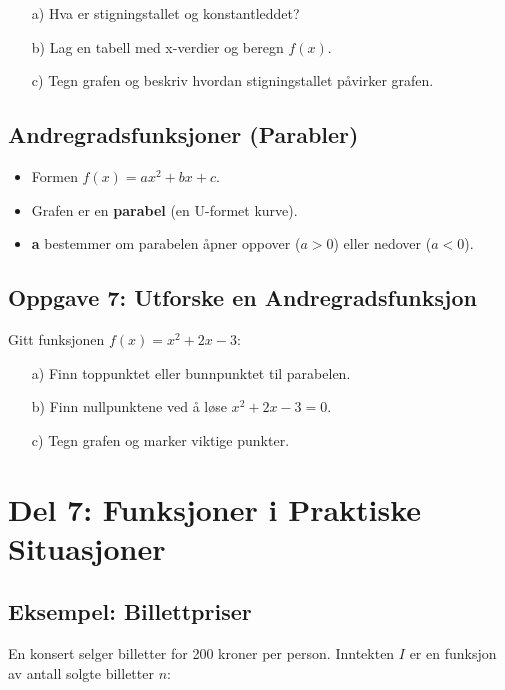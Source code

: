 \documentclass[12pt]{article}
\begin{document}
\begin{enumerate}
    \item[a)] Hva er stigningstallet og konstantleddet?
    \item[b)] Lag en tabell med x-verdier og beregn \( f(x) \).
    \item[c)] Tegn grafen og beskriv hvordan stigningstallet påvirker grafen.
\end{enumerate}

\subsection*{Andregradsfunksjoner (Parabler)}

\begin{itemize}
    \item Formen \( f(x) = ax^2 + bx + c \).
    \item Grafen er en \textbf{parabel} (en U-formet kurve).
    \item \textbf{a} bestemmer om parabelen åpner oppover (\( a > 0 \)) eller nedover (\( a < 0 \)).
\end{itemize}

\subsection*{Oppgave 7: Utforske en Andregradsfunksjon}

Gitt funksjonen \( f(x) = x^2 + 2x - 3 \):

\begin{enumerate}
    \item[a)] Finn toppunktet eller bunnpunktet til parabelen.
    \item[b)] Finn nullpunktene ved å løse \( x^2 + 2x - 3 = 0 \).
    \item[c)] Tegn grafen og marker viktige punkter.
\end{enumerate}

\section*{Del 7: Funksjoner i Praktiske Situasjoner}

\subsection*{Eksempel: Billettpriser}

En konsert selger billetter for 200 kroner per person. Inntekten \( I \) er en funksjon av antall solgte billetter \( n \):
\end{document}
